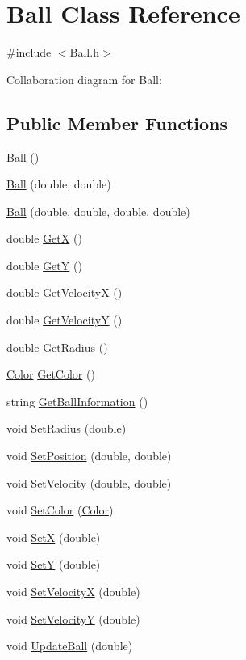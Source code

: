 \hypertarget{classBall}{\section{Ball Class Reference}
\label{classBall}
}


{\ttfamily \#include $<$Ball.\+h$>$}



Collaboration diagram for Ball\+:
\subsection*{Public Member Functions}
\begin{DoxyCompactItemize}
\item 
\hyperlink{classBall_a86a144d3dad6c953e422e32435923bbb}{Ball} ()
\item 
\hyperlink{classBall_a23fc2853f5b7d2c4c04be3a025f63811}{Ball} (double, double)
\item 
\hyperlink{classBall_ac0194e2f3b841756b7237e0d9c22967f}{Ball} (double, double, double, double)
\item 
double \hyperlink{classBall_ad24c7dfa22e546da923858a01d676565}{Get\+X} ()
\item 
double \hyperlink{classBall_a22cf86bf47aa58969cb7f2409fa15713}{Get\+Y} ()
\item 
double \hyperlink{classBall_a5c91c38f628dccee0fd3010d792f32f0}{Get\+Velocity\+X} ()
\item 
double \hyperlink{classBall_adc7030f9f566eed0bec433ff059471d3}{Get\+Velocity\+Y} ()
\item 
double \hyperlink{classBall_a51717a85f2d8e073aed1d0a3765b9705}{Get\+Radius} ()
\item 
\hyperlink{classColor}{Color} \hyperlink{classBall_a8560830fd50768e3dea23ea6acb805e4}{Get\+Color} ()
\item 
string \hyperlink{classBall_a1262df24d9535780d0d1b5e84898873a}{Get\+Ball\+Information} ()
\item 
void \hyperlink{classBall_a686405761606ff9cb10f3dec4c15f6c7}{Set\+Radius} (double)
\item 
void \hyperlink{classBall_afad56cc42fbb1b318e80f7eba2dfe97f}{Set\+Position} (double, double)
\item 
void \hyperlink{classBall_a59b9ebf30a319a98f761816caa5a7810}{Set\+Velocity} (double, double)
\item 
void \hyperlink{classBall_a3005173f0433ba7e4a17e3f17e17ad3f}{Set\+Color} (\hyperlink{classColor}{Color})
\item 
void \hyperlink{classBall_ab568ff882cf687755620b05d23fcc0b2}{Set\+X} (double)
\item 
void \hyperlink{classBall_a908bf44a408752a5a57dca7208e88261}{Set\+Y} (double)
\item 
void \hyperlink{classBall_ac6b233f8bfa2f301639fcc47812a71a5}{Set\+Velocity\+X} (double)
\item 
void \hyperlink{classBall_add36cd0acd3a4cfd20c89fdb5ae57c75}{Set\+Velocity\+Y} (double)
\item 
void \hyperlink{classBall_acad1151201f428ab9d04115fe6e5fce6}{Update\+Ball} (double)
\end{DoxyCompactItemize}

